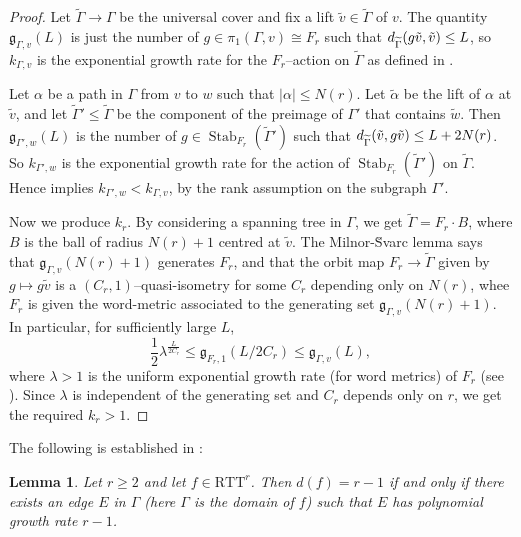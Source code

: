 \documentclass[11pt,oneside]{amsart}
\newtheorem{lem}[thm]{Lemma}
\theoremstyle{definition}
\DeclareMathOperator{\stabilizer}{Stab}
\newcommand{\dist}{\textup{\textsf{d}}}
\newcommand{\gate}{\mathfrak g}
\newcommand{\ttm}{\mathrm{RTT}}
\begin{document}
\begin{proof}
Let $\widetilde\Gamma\to \Gamma$ be the universal cover and fix a lift $\tilde v\in\widetilde \Gamma$ of $v$.  The quantity $\gate_{\Gamma,v}(L)$ is just the number of $g\in\pi_1(\Gamma,v)\cong F_r$ such that $\dist_{\widetilde \Gamma}(g\tilde v,\tilde v)\leq L$, so $k_{\Gamma,v}$ is the exponential growth rate for the $F_r$--action on $\widetilde \Gamma$ as defined in \cite[Eqn. 1.2]{DahmaniFuterWise}.  

Let $\alpha$ be a path in $\Gamma$ from $v$ to $w$ such that $|\alpha|\leq N(r)$.  Let $\tilde\alpha$ be the lift of $\alpha$ at $\tilde v$, and let $\widetilde \Gamma'\leq \widetilde \Gamma$ be the component of the preimage of $\Gamma'$ that contains $\tilde w$.  Then $\gate_{\Gamma',w}(L)$ is the number of $g\in \stabilizer_{F_r}(\widetilde \Gamma')$ such that $\dist_{\widetilde \Gamma}(\tilde v,g\tilde v)\leq L+2N(r)$.  So $k_{\Gamma',w}$ is the exponential growth rate for the action of $\stabilizer_{F_r}(\widetilde \Gamma')$ on $\widetilde \Gamma$.  Hence \cite[Thm. 1.1]{DahmaniFuterWise} implies $k_{\Gamma',w}<k_{\Gamma,v}$, by the rank assumption on the subgraph $\Gamma'$.

Now we produce $k_r$.  By considering a spanning tree in $\Gamma$, we get $\widetilde\Gamma=F_r\cdot B$, where $B$ is the ball of radius $N(r)+1$ centred at $\tilde v$.  The Milnor-\u{S}varc lemma says that $\gate_{\Gamma,v}(N(r)+1)$ generates $F_r$, and that the orbit map $F_r\to \widetilde\Gamma$ given by $g\mapsto g\tilde v$ is a $(C_r,1)$--quasi-isometry for some $C_r$ depending only on $N(r)$, whee $F_r$ is given the word-metric associated to the generating set $\gate_{\Gamma,v}(N(r)+1)$.  In particular, for sufficiently large $L$,
$$\frac{1}{2}\lambda^{\frac{L}{2C_r}}\leq\gate_{F_r,1}(L/2C_r)\leq\gate_{\Gamma,v}(L),$$
where $\lambda>1$ is the uniform exponential growth rate (for word metrics) of $F_r$ (see \cite{delaHarpe}).  Since $\lambda$ is independent of the generating set and $C_r$ depends only on $r$, we get the required $k_r>1$.  
\end{proof}

The following is established in \cite[Lem. 2.16]{Macura:detour}:

\begin{lem}\label{lem:fast-edge}
Let $r\geq 2$ and let $f\in\ttm^r$.  Then $d(f)=r-1$ if and only if there exists an edge $E$ in $\Gamma$ (here $\Gamma$ is the domain of $f$) such that $E$ has polynomial growth rate $r-1$.  
\end{lem}
\end{document}
